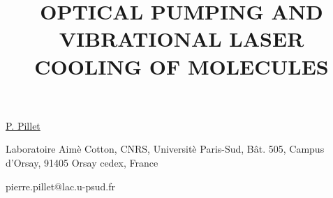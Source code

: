 \title{OPTICAL PUMPING AND VIBRATIONAL LASER COOLING OF MOLECULES}

\underline{P. Pillet} 

{\normalsize{\vspace{-4mm}
Laboratoire Aim\`e Cotton, CNRS, Universit\`e Paris-Sud, B\^at. 505,
Campus d'Orsay, 91405 Orsay cedex, France

\email pierre.pillet@lac.u-psud.fr}}

\vspace{\baselineskip}